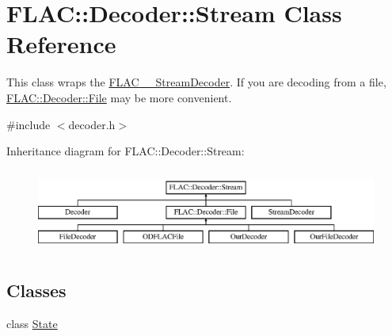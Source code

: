 \hypertarget{class_f_l_a_c_1_1_decoder_1_1_stream}{}\section{F\+L\+AC\+:\+:Decoder\+:\+:Stream Class Reference}
\label{class_f_l_a_c_1_1_decoder_1_1_stream}


This class wraps the \hyperlink{struct_f_l_a_c_____stream_decoder}{F\+L\+A\+C\+\_\+\+\_\+\+Stream\+Decoder}. If you are decoding from a file, \hyperlink{class_f_l_a_c_1_1_decoder_1_1_file}{F\+L\+A\+C\+::\+Decoder\+::\+File} may be more convenient.  




{\ttfamily \#include $<$decoder.\+h$>$}

Inheritance diagram for F\+L\+AC\+:\+:Decoder\+:\+:Stream\+:\begin{figure}[H]
\begin{center}
\leavevmode
\includegraphics[height=2.745098cm]{class_f_l_a_c_1_1_decoder_1_1_stream}
\end{center}
\end{figure}
\subsection*{Classes}
\begin{DoxyCompactItemize}
\item 
class \hyperlink{class_f_l_a_c_1_1_decoder_1_1_stream_1_1_state}{State}
\end{DoxyCompactItemize}
